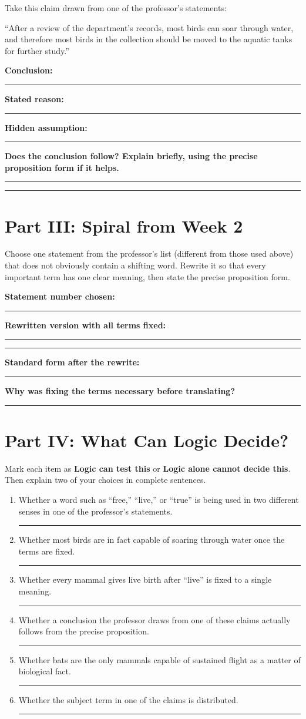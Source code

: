 \documentclass[12pt]{article}
\newcommand{\focusbox}[1]{%
\par\vspace{0.35em}\noindent\begingroup\setlength{\fboxsep}{6pt}\colorbox{gray!12}{\begin{minipage}{\dimexpr\linewidth-2\fboxsep\relax}#1\end{minipage}}\endgroup\par\vspace{0.45em}}
\newcommand{\studentline}{\par\vspace{0.60em}\hrule\vspace{0.64em}}
\newcommand{\shortline}{\par\vspace{0.38em}\hrule\vspace{0.48em}}
\begin{document}
Take this claim drawn from one of the professor's statements:

\focusbox{``After a review of the department's records, most birds can soar through water, and therefore most birds in the collection should be moved to the aquatic tanks for further study.''}

\textbf{Conclusion:}\shortline

\textbf{Stated reason:}\shortline

\textbf{Hidden assumption:}\shortline

\textbf{Does the conclusion follow? Explain briefly, using the precise proposition form if it helps.}\studentline\studentline

\Needspace{0.38\textheight}
\section*{Part III: Spiral from Week 2}

Choose one statement from the professor's list (different from those used above) that does not obviously contain a shifting word. Rewrite it so that every important term has one clear meaning, then state the precise proposition form.

\textbf{Statement number chosen:}\rule{0.8in}{0.4pt}

\textbf{Rewritten version with all terms fixed:}\studentline\studentline

\textbf{Standard form after the rewrite:}\shortline

\textbf{Why was fixing the terms necessary before translating?}\studentline

\Needspace{0.42\textheight}
\section*{Part IV: What Can Logic Decide?}

Mark each item as \textbf{Logic can test this} or \textbf{Logic alone cannot decide this}. Then explain two of your choices in complete sentences.

\begin{enumerate}[leftmargin=*]
\item Whether a word such as ``free,'' ``live,'' or ``true'' is being used in two different senses in one of the professor's statements. \hfill \rule{1.6in}{0.4pt}
\item Whether most birds are in fact capable of soaring through water once the terms are fixed. \hfill \rule{1.6in}{0.4pt}
\item Whether every mammal gives live birth after ``live'' is fixed to a single meaning. \hfill \rule{1.6in}{0.4pt}
\item Whether a conclusion the professor draws from one of these claims actually follows from the precise proposition. \hfill \rule{1.6in}{0.4pt}
\item Whether bats are the only mammals capable of sustained flight as a matter of biological fact. \hfill \rule{1.6in}{0.4pt}
\item Whether the subject term in one of the claims is distributed. \hfill \rule{1.6in}{0.4pt}
\end{enumerate}
\end{document}

